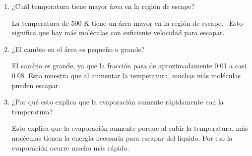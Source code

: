 \documentclass[a4paper, 11pt]{article}
\newcommand{\Pspace}{0.5cm}
\newcommand{\Aspace}{0.2cm}
\begin{document}
\newpage
\begin{enumerate}
    \vspace{\Pspace}
    \item ¿Cuál temperatura tiene mayor área en la región de escape? \par
        \vspace{\Aspace} \par
        { \color{azul}  
            La temperatura de 500 K tiene un área mayor en la región de escape. \
            Esto significa que hay más moléculas con suficiente velocidad para escapar.
        }

    \vspace{\Pspace}
    \item ¿El cambio en el área es pequeño o grande? \par
        \vspace{\Aspace} \par
        { \color{azul}  
            El cambio es grande, ya que la fracción pasa de aproximadamente 0.01 a casi 0.08. 
            Esto muestra que al aumentar la temperatura, muchas más moléculas pueden escapar.
        }

    \vspace{\Pspace}
    \item ¿Por qué esto explica que la evaporación aumente rápidamente con la temperatura? \par
        \vspace{\Aspace} \par
        { \color{azul}  
            Esto explica que la evaporación aumente porque al subir la temperatura, 
            más moléculas tienen la energía necesaria para escapar del líquido. 
            Por eso la evaporación ocurre mucho más rápido.
        }
\end{enumerate}
\end{document}
